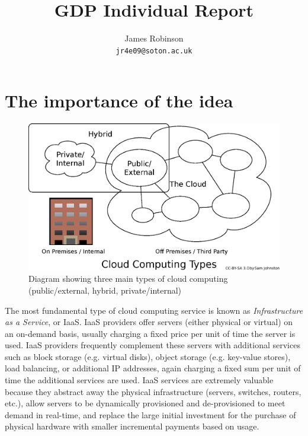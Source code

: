 \documentclass[a4paper]{proc}
\begin{document}
  \title{GDP Individual Report}
  \author{James Robinson\\\texttt{jr4e09@soton.ac.uk}}
  \maketitle

  \begin{abstract}
  \end{abstract}



  \section{The importance of the idea}


  \begin{figure}
    \centering
    \includegraphics[width=\columnwidth]{figures/Cloud_computing_types.eps}
    \caption{Diagram showing three main types of cloud computing (public/external, hybrid, private/internal) \cite{Joton2009}}
    \label{fig:cloud_computing_types}
  \end{figure}

  The most fundamental type of cloud computing service is known as \emph{Infrastructure as a Service}, or IaaS. IaaS providers offer servers (either physical or virtual) on an on-demand basis, usually charging a fixed price per unit of time the server is used. IaaS providers frequently complement these servers with additional services such as block storage (e.g. virtual disks), object storage (e.g. key-value stores), load balancing, or additional IP addresses, again charging a fixed sum per unit of time the additional services are used. IaaS services are extremely valuable because they abstract away the physical infrastructure (servers, switches, routers, etc.), allow servers to be dynamically provisioned and de-provisioned to meet demand in real-time, and replace the large initial investment for the purchase of physical hardware with smaller incremental payments based on usage.
\end{document}

